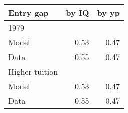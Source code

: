 \begin{tabular}{lrr}
\hline
Entry gap & by IQ  & by yp  \\ 
\hline
1979 &   &   \\ 
Model & 0.53  & 0.47  \\ 
Data & 0.55  & 0.47  \\ 
Higher tuition &   &   \\ 
Model & 0.53  & 0.47  \\ 
Data & 0.55  & 0.47  \\ 
\hline
\end{tabular}%
